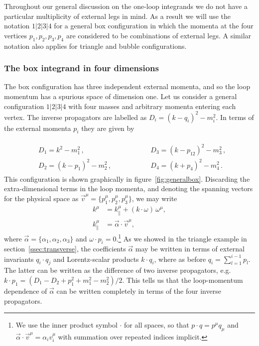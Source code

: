 Throughout our general discussion on the one-loop integrands we do not have a
particular multiplicity of external legs in mind. As a result we will use the
notation $1|2|3|4$ for a general box configuration in which the momenta at the
four vertices $p_1, p_2, p_3, p_4$ are considered to be combinations of external legs. A similar notation also
applies for triangle and bubble configurations.

\subsubsection{The box integrand in four dimensions \label{sssec:4dbox}}

The box configuration has three independent external momenta, and so the loop
momentum has a spurious space of dimension one. Let us consider a general
configuration $1|2|3|4$ with four masses and arbitrary momenta entering each vertex. The
inverse propagators are labelled as $D_i = (k-q_i)^2 - m_i^2$. In terms of the external momenta $p_i$ they are given by

\begin{align} 
\begin{alignedat}{2}
  & D_1 = k^2-m_1^2\,, && D_3 = (k-p_{12})^2 - m_3^2 \,, \\
  & D_2 = (k-p_1)^2 - m_2^2\,, \qquad \qquad && D_4 = (k+p_4)^2 - m_4^2 \,.
\end{alignedat}
\label{eq:boxprops}
\end{align}
This configuration is shown graphically in figure~\ref{fig:generalbox}.
Discarding the extra-dimensional terms in the loop momenta, and denoting the spanning vectors for the physical
space as $\vec{v}^\mu = \{p_1^\mu,p_2^\mu,p_3^\mu\}$, we may write
\begin{align}
  k^\mu &= k^\mu_{\parallel} + (k\cdot\omega) \, \omega^\mu,
  \label{eq:momparam} \\
  k^\mu_{\parallel} &= \vec{\alpha} \cdot \vec{v}^\mu,
  \label{eq:kphysbasis}
\end{align}
where $\vec{\alpha} = \{\alpha_1, \alpha_2, \alpha_3\}$ and $\omega \cdot p_i =
0$.\footnote{We use the inner product symbol $\cdot$ for all spaces, so that  $p\cdot q = p^\mu q_\mu$ and $\vec{\alpha}\cdot \vec{v}^\mu = \alpha_i v_i^\mu$ with summation over repeated indices implicit.} As we showed in the triangle example in section~\ref{ssec:transverse}, the
coefficients $\vec{\alpha}$ may be written in terms of external invariants
$q_i\cdot q_j$ and Lorentz-scalar products $k\cdot q_i$, where as before $q_i =
\sum_{l=1}^{i-1} p_l$. The latter can be written as
the difference of two inverse propagators, e.g.\ $k\cdot p_1 = (D_1 - D_2  +
p_1^2 + m_1^2 - m_2^2)/2$. This tells us that the loop-momentum dependence of
$\vec{\alpha}$ can be written completely in terms of the four inverse
propagators.

